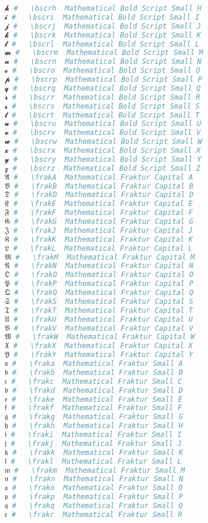 \begin{lstlisting}[language=Julia]
𝓱 #   \bscrh  Mathematical Bold Script Small H
𝓲 #   \bscri  Mathematical Bold Script Small I
𝓳 #   \bscrj  Mathematical Bold Script Small J
𝓴 #   \bscrk  Mathematical Bold Script Small K
𝓵 #   \bscrl  Mathematical Bold Script Small L
𝓶 #   \bscrm  Mathematical Bold Script Small M
𝓷 #   \bscrn  Mathematical Bold Script Small N
𝓸 #   \bscro  Mathematical Bold Script Small O
𝓹 #   \bscrp  Mathematical Bold Script Small P
𝓺 #   \bscrq  Mathematical Bold Script Small Q
𝓻 #   \bscrr  Mathematical Bold Script Small R
𝓼 #   \bscrs  Mathematical Bold Script Small S
𝓽 #   \bscrt  Mathematical Bold Script Small T
𝓾 #   \bscru  Mathematical Bold Script Small U
𝓿 #   \bscrv  Mathematical Bold Script Small V
𝔀 #   \bscrw  Mathematical Bold Script Small W
𝔁 #   \bscrx  Mathematical Bold Script Small X
𝔂 #   \bscry  Mathematical Bold Script Small Y
𝔃 #   \bscrz  Mathematical Bold Script Small Z
𝔄 #   \frakA  Mathematical Fraktur Capital A
𝔅 #   \frakB  Mathematical Fraktur Capital B
𝔇 #   \frakD  Mathematical Fraktur Capital D
𝔈 #   \frakE  Mathematical Fraktur Capital E
𝔉 #   \frakF  Mathematical Fraktur Capital F
𝔊 #   \frakG  Mathematical Fraktur Capital G
𝔍 #   \frakJ  Mathematical Fraktur Capital J
𝔎 #   \frakK  Mathematical Fraktur Capital K
𝔏 #   \frakL  Mathematical Fraktur Capital L
𝔐 #   \frakM  Mathematical Fraktur Capital M
𝔑 #   \frakN  Mathematical Fraktur Capital N
𝔒 #   \frakO  Mathematical Fraktur Capital O
𝔓 #   \frakP  Mathematical Fraktur Capital P
𝔔 #   \frakQ  Mathematical Fraktur Capital Q
𝔖 #   \frakS  Mathematical Fraktur Capital S
𝔗 #   \frakT  Mathematical Fraktur Capital T
𝔘 #   \frakU  Mathematical Fraktur Capital U
𝔙 #   \frakV  Mathematical Fraktur Capital V
𝔚 #   \frakW  Mathematical Fraktur Capital W
𝔛 #   \frakX  Mathematical Fraktur Capital X
𝔜 #   \frakY  Mathematical Fraktur Capital Y
𝔞 #   \fraka  Mathematical Fraktur Small A
𝔟 #   \frakb  Mathematical Fraktur Small B
𝔠 #   \frakc  Mathematical Fraktur Small C
𝔡 #   \frakd  Mathematical Fraktur Small D
𝔢 #   \frake  Mathematical Fraktur Small E
𝔣 #   \frakf  Mathematical Fraktur Small F
𝔤 #   \frakg  Mathematical Fraktur Small G
𝔥 #   \frakh  Mathematical Fraktur Small H
𝔦 #   \fraki  Mathematical Fraktur Small I
𝔧 #   \frakj  Mathematical Fraktur Small J
𝔨 #   \frakk  Mathematical Fraktur Small K
𝔩 #   \frakl  Mathematical Fraktur Small L
𝔪 #   \frakm  Mathematical Fraktur Small M
𝔫 #   \frakn  Mathematical Fraktur Small N
𝔬 #   \frako  Mathematical Fraktur Small O
𝔭 #   \frakp  Mathematical Fraktur Small P
𝔮 #   \frakq  Mathematical Fraktur Small Q
𝔯 #   \frakr  Mathematical Fraktur Small R

\end{lstlisting}

